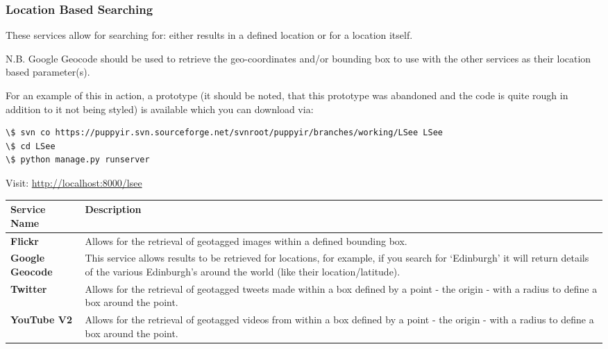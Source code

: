 \documentclass[letterpaper,10pt,english]{sphinxmanual}
\begin{document}
\subsubsection{Location Based Searching}
\label{overview:location-based-searching}
These services allow for searching for: either results in a defined location or for a location itself.

N.B. Google Geocode should be used to retrieve the geo-coordinates and/or bounding box to use with the other services as their location based parameter(s).

For an example of this in action, a prototype (it should be noted, that this prototype was abandoned and the code is quite rough in addition to it not being styled) is available which you can download via:

\begin{Verbatim}[commandchars=\\\{\}]
\$ svn co https://puppyir.svn.sourceforge.net/svnroot/puppyir/branches/working/LSee LSee
\$ cd LSee
\$ python manage.py runserver
\end{Verbatim}

Visit: \href{http://localhost:8000/lsee}{http://localhost:8000/lsee}

\begin{tabulary}{\linewidth}{|L|L|}
\hline
\textbf{
Service Name
} & \textbf{
Description
}\\\hline

\textbf{Flickr}
 & 
Allows for the retrieval of geotagged images within a defined bounding box.
\\\hline

\textbf{Google Geocode}
 & 
This service allows results to be retrieved for locations, for example, if you search for `Edinburgh' it will return details of the various Edinburgh's around the world (like their location/latitude).
\\\hline

\textbf{Twitter}
 & 
Allows for the retrieval of geotagged tweets made within a box defined by a point - the origin - with a radius to define a box around the point.
\\\hline

\textbf{YouTube V2}
 & 
Allows for the retrieval of geotagged videos from within a box defined by a point - the origin - with a radius to define a box around the point.
\\\hline
\end{tabulary}
\end{document}
